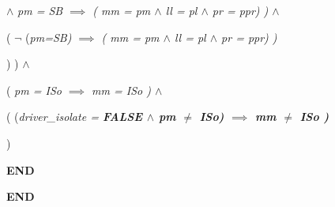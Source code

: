 {\begin{minipage}{14cm}
\hspace*{1.00in} $\land$  \it pm \rm = \it SB  $\implies$  \rm ( \it mm \rm = \it pm  $\land$  \it ll \rm = \it pl  $\land$  \it pr \rm = \it ppr\rm ) \rm )  $\land$ 

\hspace*{0.80in}\rm ( $\neg$ \rm (\it pm\rm =\it SB\rm )  $\implies$  \rm ( \it mm \rm = \it pm  $\land$  \it ll \rm = \it pl  $\land$  \it pr \rm = \it ppr\rm ) \rm )

\hspace*{0.80in}\rm ) \rm )  $\land$ 

\hspace*{0.60in}\rm ( \it pm \rm = \it ISo  $\implies$  \it mm \rm = \it ISo \rm )\hspace*{0.25in} $\land$ 

\hspace*{0.60in}\rm ( \rm (\it driver\_isolate \rm = \bf FALSE  $\land$  \it pm  $\not =$  \it ISo\rm )  $\implies$ \hspace*{0.10in}\it mm  $\not =$  \it ISo \rm )\hspace*{0.40in}

\hspace*{0.60in}\rm )

\hspace*{0.20in}\bf END

\bf END

\end{minipage}
}


\newpage


